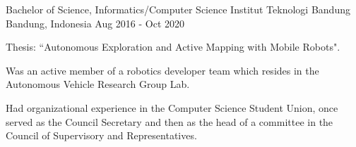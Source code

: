 

\begin{cventries}

  \cventry
    {Bachelor of Science, Informatics/Computer Science} %
    {Institut Teknologi Bandung} %
    {Bandung, Indonesia} %
    {Aug 2016 - Oct 2020} %
    {
   	  \begin{cvitems}
		  \item {Thesis: ``Autonomous Exploration and Active Mapping with Mobile Robots".}
		  \item {Was an active member of a robotics developer team which resides in the Autonomous Vehicle Research Group Lab.}
          \item {Had organizational experience in the Computer Science Student Union, once served as the Council Secretary and then as the head of a committee in the Council of Supervisory and Representatives.}
   	  \end{cvitems}
    }

\end{cventries}
